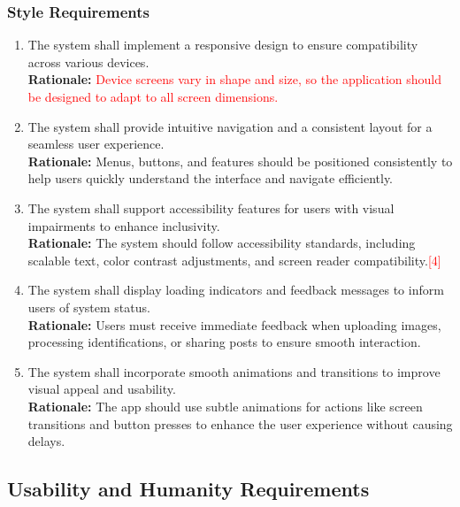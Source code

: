 \documentclass{article}
\begin{document}
\subsubsection{Style Requirements}
\label{ssub:style_requirements}
\begin{enumerate}[{LF-S}1. ]
	\item The system shall implement a responsive design to ensure compatibility across various devices.\\
	\textbf{Rationale:} \textcolor{red}{Device screens vary in shape and size, so the application should be designed to adapt to all screen dimensions.}
	\item The system shall provide intuitive navigation and a consistent layout for a seamless user experience.\\
	\textbf{Rationale:} Menus, buttons, and features should be positioned consistently to help users quickly understand the interface and navigate efficiently.
	\item The system shall support accessibility features for users with visual impairments to enhance inclusivity.\\
	\textbf{Rationale:} The system should follow accessibility standards, including scalable text, color contrast adjustments, and screen reader compatibility.\textcolor{red}{[4]}
	\item The system shall display loading indicators and feedback messages to inform users of system status.\\
	\textbf{Rationale:} Users must receive immediate feedback when uploading images, processing identifications, or sharing posts to ensure smooth interaction.
	\item The system shall incorporate smooth animations and transitions to improve visual appeal and usability.\\
	\textbf{Rationale:} The app should use subtle animations for actions like screen transitions and button presses to enhance the user experience without causing delays.
\end{enumerate}


\subsection{Usability and Humanity Requirements}
\label{sub:usability_and_humanity_requirements}
\end{document}
